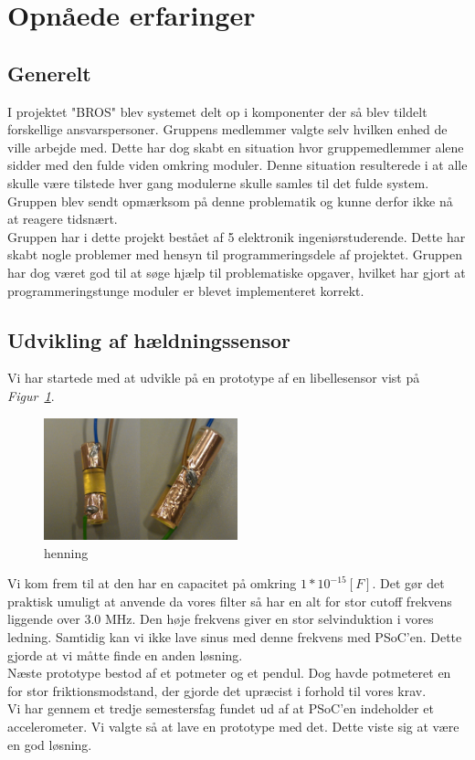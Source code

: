 \section{Opnåede erfaringer}
\label{ch:OpXP}
\subsection{Generelt}
I projektet "BROS" blev systemet delt op i komponenter der så blev tildelt forskellige ansvarspersoner. Gruppens medlemmer valgte selv hvilken enhed de ville arbejde med. Dette har dog skabt en situation hvor gruppemedlemmer alene sidder med den fulde viden omkring moduler. Denne situation resulterede i at alle skulle være tilstede hver gang modulerne skulle samles til det fulde system. Gruppen blev sendt opmærksom på denne problematik og kunne derfor ikke nå at reagere tidsnært.\\
Gruppen har i dette projekt bestået af 5 elektronik ingeniørstuderende. Dette har skabt nogle problemer med hensyn til programmeringsdele af projektet. Gruppen har dog været god til at søge hjælp til problematiske opgaver, hvilket har gjort at programmeringstunge moduler er blevet implementeret korrekt.\\

\subsection{Udvikling af hældningssensor}
Vi har startede med at udvikle på en prototype af en libellesensor vist på \textit{Figur~\ref{fig:libelle}}.
\begin{figure}[hbpt]
\centering
\includegraphics[width=0.5\textwidth]{billeder/libellesensor1}
\caption{henning}
\label{fig:libelle}
\end{figure}
Vi kom frem til at den har en capacitet på omkring $1*10^{-15}[F]$. Det gør det praktisk umuligt at anvende da vores filter så har en alt for stor cutoff frekvens liggende over 3.0 MHz. Den høje frekvens giver en stor selvinduktion i vores ledning. Samtidig kan vi ikke lave sinus med denne frekvens med PSoC'en. Dette gjorde at vi måtte finde en anden løsning.\\
Næste prototype bestod af et potmeter og et pendul. Dog havde potmeteret en for stor friktionsmodstand, der gjorde det upræcist i forhold til vores krav.\\
Vi har gennem et tredje semestersfag fundet ud af at PSoC'en indeholder et accelerometer. Vi valgte så at lave en prototype med det. Dette viste sig at være en god løsning.

